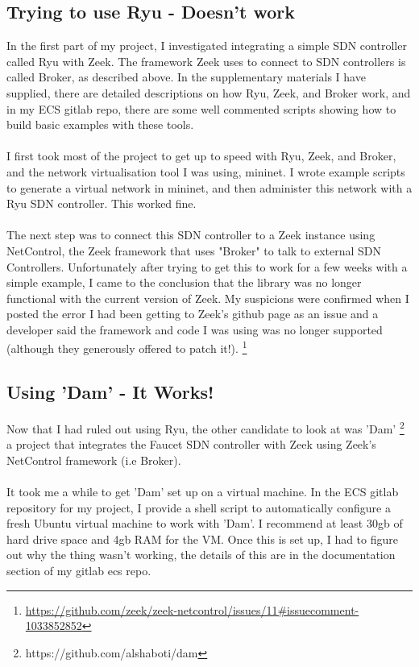 \documentclass{article}
\begin{document}
\subsection{Trying to use Ryu - Doesn't work}
In the first part of my project, I investigated integrating a simple SDN controller called Ryu with Zeek. The framework Zeek uses to connect to SDN controllers is called Broker, as described above. In the supplementary materials I have supplied, there are detailed descriptions on how Ryu, Zeek, and Broker work, and in my ECS gitlab repo, there are some well commented scripts showing how to build basic examples with these tools.
\\
\\
I first took most of the project to get up to speed with Ryu, Zeek, and Broker, and the network virtualisation tool I was using, mininet. I wrote example scripts to generate a virtual network in mininet, and then administer this network with a Ryu SDN controller. This worked fine.
\\
\\
The next step was to connect this SDN controller to a Zeek instance using NetControl, the Zeek framework that uses "Broker" to talk to external SDN Controllers. Unfortunately after trying to get this to work for a few weeks with a simple example, I came to the conclusion that the library was no longer functional with the current version of Zeek. My suspicions were confirmed when I posted the error I had been getting to Zeek's github page as an issue and a developer said the framework and code I was using was no longer supported (although they generously offered to patch it!).
\footnote{ \url{https://github.com/zeek/zeek-netcontrol/issues/11#issuecomment-1033852852}}
\newpage
\subsection{Using 'Dam' - It Works!}
Now that I had ruled out using Ryu, the other candidate to look at was 'Dam' \footnote{https://github.com/alshaboti/dam} a project that integrates the Faucet SDN controller with Zeek using Zeek's NetControl framework (i.e Broker). 
\\
\\
It took me a while to get 'Dam' set up on a virtual machine. In the ECS gitlab repository for my project, I provide a shell script to automatically configure a fresh Ubuntu virtual machine to work with 'Dam'. I recommend at least 30gb of hard drive space and 4gb RAM for the VM. Once this is set up, I had to figure out why the thing wasn't working, the details of this are in the documentation section of my gitlab ecs repo.
\end{document}
